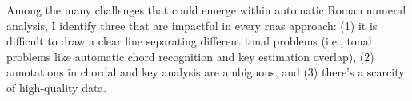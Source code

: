 

Among the many challenges that could emerge within automatic
Roman numeral analysis, I identify three that are impactful
in every \glspl{rna} approach: (1) it is difficult to draw a clear line separating
different tonal problems (i.e., tonal problems like automatic chord recognition and key estimation overlap), (2)
annotations in chordal and key analysis are ambiguous, and (3) there's a scarcity of high-quality data.

